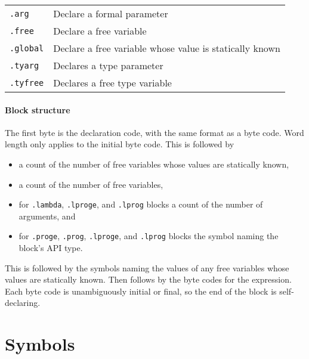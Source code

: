 \documentclass{article}
\begin{document}
\begin{tabular}{l@{ --- }l}
  \texttt{.arg} & Declare a formal parameter \\
  \texttt{.free} & Declare a free variable \\
  \texttt{.global} & Declare a free variable whose value is statically known \\
  \texttt{.tyarg} & Declares a type parameter \\
  \texttt{.tyfree} & Declares a free type variable \\
\end{tabular}

\paragraph{Block structure}

The first byte is the declaration code, with the same format as a byte code.
Word length only applies to the initial byte code.
This is followed by
\begin{itemize}
\item a count of the number of free variables whose values are statically known,
\item a count of the number of free variables,
\item for \texttt{.lambda}, \texttt{.lproge}, and \texttt{.lprog} blocks a count of the number of arguments, and
\item for \texttt{.proge}, \texttt{.prog}, \texttt{.lproge}, and \texttt{.lprog} blocks the symbol naming the block's API type.
\end{itemize}
This is followed by the symbols naming the values of any free variables whose values are statically known.
Then follows by the byte codes for the expression.
Each byte code is unambiguously initial or final, so the end of the block is self-declaring.

\section{Symbols}
\end{document}
